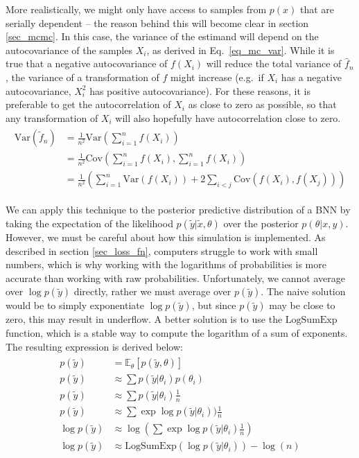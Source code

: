 \documentclass[12pt]{article}
\begin{document}
More realistically, we might only have access to samples from $p(x)$ that are serially dependent -- the reason behind this will become clear in section \ref{sec_mcmc}. In this case, the variance of the estimand will depend on the autocovariance of the samples $X_i$, as derived in Eq.\ \ref{eq_mc_var}. While it is true that a negative autocovariance of $f(X_i)$ will reduce the total variance of $\hat{f}_n$, the variance of a transformation of $f$ might increase (e.g.\, if $X_i$ has a negative autocovariance, $X_i^2$ has positive autocovariance). For these reasons, it is preferable to get the autocorrelation of $X_i$ as close to zero as possible, so that any transformation of $X_i$ will also hopefully have autocorrelation close to zero.
\begin{align}
\begin{split}
\text{Var} \left( \tilde{f}_n \right) &= \frac{1}{n^2} \text{Var} \left( \sum_{i=1}^n f(X_i)\right) \\
&= \frac{1}{n^2} \text{Cov} \left( \sum_{i=1}^n f\left(X_{i}\right), \sum_{i=1}^{n} f(X_{i})\right) \\
&=\frac{1}{n^2} \left (\sum_{i=1}^n \text{Var}(f(X_{i}))+2 \sum_{i<j} \text{Cov}(f(X_{i}), f(X_{j}))\right)
\end{split}
\label{eq_mc_var}
\end{align}

We can apply this technique to the posterior predictive distribution of a BNN by taking the expectation of the likelihood $p(\tilde{y}|\tilde{x},\theta)$ over the posterior $p(\theta|x,y)$. However, we must be careful about how this simulation is implemented. As described in section \ref{sec_loss_fn}, computers struggle to work with small numbers, which is why working with the logarithms of probabilities is more accurate than working with raw probabilities. Unfortunately, we cannot average over $\log p(\tilde{y})$ directly, rather we must average over $p(\tilde{y})$. The naive solution would be to simply exponentiate $\log p(\tilde{y})$, but since $p(\tilde{y})$ may be close to zero, this may result in underflow. A better solution is to use the $\textrm{LogSumExp}$ function, which is a stable way to compute the logarithm of a sum of exponents. The resulting expression is derived below:
\begin{align}
\begin{split}
p(\tilde{y}) &= \mathbb{E}_\theta [p(\tilde{y}, \theta)] \\
p(\tilde{y}) &\approx \sum p(\tilde{y}|\theta_i) p(\theta_i) \\
p(\tilde{y}) &\approx \sum p(\tilde{y}|\theta_i) \frac{1}{n} \\
p(\tilde{y}) &\approx \sum \exp \log p(\tilde{y}|\theta_i)) \frac{1}{n} \\
\log p(\tilde{y}) &\approx \log(\sum \exp \log p(\tilde{y}|\theta_i) \frac{1}{n}) \\
\log p(\tilde{y}) &\approx \textrm{LogSumExp} (\log p(\tilde{y}|\theta_i)) - \log(n)
\end{split}
\end{align}
\end{document}
